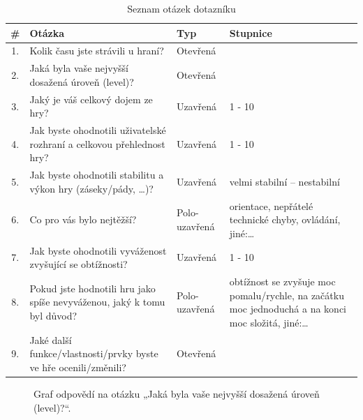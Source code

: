 \begin{table}[h]
    \centering
    \renewcommand{\arraystretch}{1.3}
    \begin{tabularx}{\textwidth}{c|X|l|X}
    \hline
    \textbf{\#} & \textbf{Otázka} & \textbf{Typ} & \textbf{Stupnice} \\ \hline
    1. & Kolik času jste strávili u hraní? & Otevřená & \\ 
    2. & Jaká byla vaše nejvyšší dosažená úroveň (level)? & Otevřená &  \\ 
    3. & Jaký je váš celkový dojem ze hry? & Uzavřená &  1 - 10 \\ 
    4. & Jak byste ohodnotili uživatelské rozhraní a celkovou přehlednost hry? & Uzavřená & 1 - 10\\ 
    5. & Jak byste ohodnotili stabilitu a výkon hry (záseky/pády, \ldots)? & Uzavřená & velmi stabilní – nestabilní\\ 
    6. & Co pro vás bylo nejtěžší? & Polo-uzavřená & orientace, nepřátelé technické chyby, ovládání, jiné:\ldots \\ 
    7. & Jak byste ohodnotili vyváženost zvyšující se obtížnosti? & Uzavřená &  1 - 10 \\ 
    8. & Pokud jste hodnotili hru jako spíše nevyváženou, jaký k tomu byl důvod? & Polo-uzavřená & obtížnost se zvyšuje moc pomalu/rychle, na začátku moc jednoduchá a na konci moc složitá, jiné:\ldots \\ 
    9. & Jaké další funkce/vlastnosti/prvky byste ve hře ocenili/změnili? & Otevřená & \\
    \hline
    \end{tabularx}
    \caption{Seznam otázek dotazníku}
    \label{tab:questions}
\end{table}

\begin{figure}[ht]
    \centering
    \caption{Graf odpovědí na otázku „Jaká byla vaše nejvyšší dosažená úroveň (level)?“.}
    \label{fig:nejvyssi_uroven}
\end{figure}

